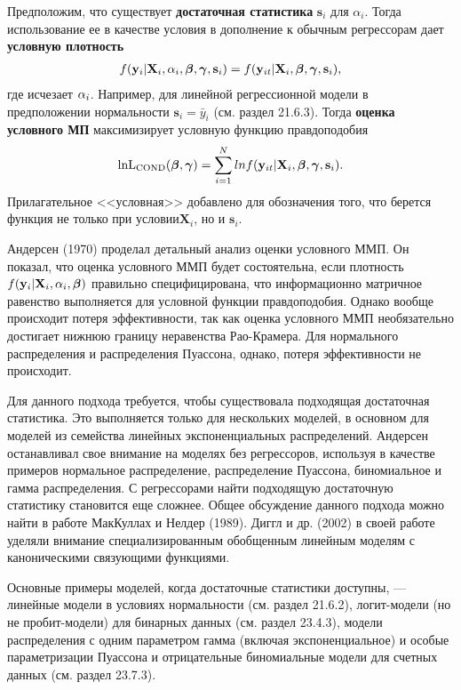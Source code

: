 Предположим, что существует \textbf{достаточная статистика} $\mathbf{s}_i$ для $\alpha_i$. Тогда использование ее в качестве условия в дополнение к обычным регрессорам дает \textbf{условную плотность}
\begin{align}
f(\mathbf{y}_i|\mathbf{X}_i, \alpha_i, \bm{\beta}, \bm\gamma,\mathbf{s}_i)= f(\mathbf{y}_{it}|\mathbf{X}_{i}, \bm{\beta}, \bm\gamma, \mathbf{s}_i),
\label{Eq:23.9}
\end{align}
где исчезает $\alpha_i$. Например, для линейной регрессионной модели в предположении нормальности $\mathbf{s}_i=\bar{y}_i$ (см. раздел 21.6.3). Тогда \textbf{оценка условного МП} максимизирует условную функцию правдоподобия
\begin{align}
\mathrm{ln L_{COND}}(\bm{\beta},\bm\gamma)= \sum^N_{i=1} ln f(\mathbf{y}_{it}|\mathbf{X}_{i}, \bm{\beta}, \bm\gamma, \mathbf{s}_i).
\label{Eq:23.10}
\end{align}
Прилагательное <<условная>> добавлено для обозначения того, что берется функция  не только при условии$\mathbf{X}_i$, но и $\mathbf{s}_i$.

Андерсен (1970) проделал детальный анализ оценки условного ММП. Он показал, что оценка условного ММП будет состоятельна, если плотность $f(\mathbf{y}_i|\mathbf{X}_i, \alpha_i, \bm{\beta})$  правильно специфицирована, что информационно матричное равенство выполняется для условной функции правдоподобия. Однако вообще происходит потеря эффективности, так как оценка условного ММП необязательно достигает  нижнюю границу неравенства Рао-Крамера. Для нормального распределения и распределения Пуассона, однако, потеря эффективности не происходит.

Для данного подхода требуется, чтобы существовала подходящая достаточная статистика. Это выполняется только для нескольких моделей, в основном для моделей из семейства линейных экспоненциальных распределений. Андерсен останавливал свое внимание на моделях без регрессоров, используя в качестве примеров нормальное распределение, распределение Пуассона, биномиальное и гамма распределения. С регрессорами найти подходящую достаточную статистику становится еще сложнее. Общее обсуждение данного подхода можно найти в работе МакКуллах и Нелдер (1989). Диггл и др. (2002) в своей работе уделяли внимание специализированным обобщенным линейным моделям с каноническими связующими функциями. 

Основные примеры моделей, когда достаточные статистики доступны, --- линейные модели в условиях нормальности (см. раздел 21.6.2), логит-модели (но не пробит-модели) для бинарных данных (см. раздел 23.4.3), модели распределения с одним параметром гамма (включая экспоненциальное) и особые параметризации Пуассона и отрицательные биномиальные модели для счетных данных (см. раздел 23.7.3).

